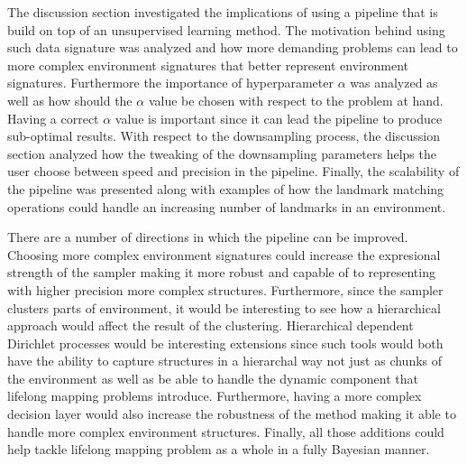 \documentclass[twoside,hidelinks]{article}
\begin{document}
 The discussion section investigated the implications of using a pipeline that is build on top of an unsupervised learning method. 
 The motivation behind using such data signature was analyzed and how more demanding problems can lead to more complex environment signatures that better represent environment signatures.
 Furthermore the importance of hyperparameter $\alpha$ was analyzed as well as how should the $\alpha$ value be chosen with respect to the problem at hand. Having a correct $\alpha$ value is important since it can lead the pipeline to produce sub-optimal results. 
 With respect to the downsampling process, the discussion section analyzed how the tweaking of the downsampling parameters helps the user choose between speed and precision in the pipeline.
 Finally, the scalability of the pipeline was presented along with examples of how the landmark matching operations could handle an increasing number of landmarks in an environment.

There are a number of directions in which the pipeline can be improved.
Choosing more complex environment signatures could increase the expresional strength of the sampler making it more robust and capable of to representing with higher precision more complex structures.
Furthermore, since the sampler clusters parts of environment, it would be interesting to see how a hierarchical approach would affect the result of the clustering.
Hierarchical dependent Dirichlet processes would be interesting extensions since such tools would both have the ability to capture structures in a hierarchal way not just as chunks of the environment as well as be able to handle the dynamic component that lifelong mapping problems introduce. 
Furthermore, having a more complex decision layer would also increase the robustness of the method making it able to handle more complex environment structures. 
Finally, all those additions could help tackle lifelong mapping problem as a whole in a fully Bayesian manner.


\end{document}
